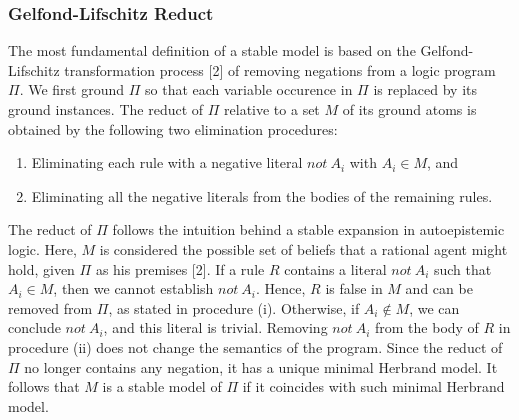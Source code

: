 \subsubsection{Gelfond-Lifschitz Reduct}
The most fundamental definition of a stable model is based on the Gelfond-Lifschitz transformation 
process [2] of removing negations from a logic program $\Pi$. 
We first ground $\Pi$ so that each variable occurence in $\Pi$ is replaced by its ground instances. 
The reduct of $\Pi$ relative to a set $M$ of its ground atoms is obtained by the following two 
elimination procedures:
\begin{enumerate}[label=(\roman*)]
    \item Eliminating each rule with a negative literal $not \: A_i$ with $A_i \in M$, and 
    \item Eliminating all the negative literals from the bodies of the remaining rules.
\end{enumerate}
The reduct of $\Pi$ follows the intuition behind a stable expansion in 
autoepistemic logic. Here, $M$ is considered the possible set of beliefs that a rational 
agent might hold, given $\Pi$ as his premises [2]. If a rule $R$ contains a literal $not \: A_i$ 
such that $A_i \in M$, then we cannot establish $not \: A_i$. Hence, $R$ is false in $M$ and can be 
removed from $\Pi$, as stated in procedure (i). Otherwise, if $A_i \not \in M$, we can conclude 
$not \: A_i$, and this literal is trivial. Removing $not \: A_i$ from the body of $R$ in 
procedure (ii) does not change the semantics of the program. Since the reduct of $\Pi$ no longer 
contains any negation, it has a unique minimal Herbrand model.  
It follows that $M$ is a stable model of $\Pi$ if it coincides with such minimal Herbrand model.

